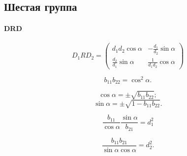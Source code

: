 \subsection{Шестая группа}

\paragraph{DRD}

$$D_1RD_2 =
\begin{pmatrix}
	d_1 d_2 \cos\alpha & -\frac{d_1}{d_2}\sin\alpha \\
	\frac{d_2}{d_1} \sin\alpha & \frac{1}{d_1 d_2}\cos\alpha
\end{pmatrix}$$

$$b_{11} b_{22} = \cos^2 \alpha.$$

$$\cos \alpha = \pm \sqrt{b_{11} b_{22}};$$
$$\sin \alpha = \pm \sqrt{1 - b_{11} b_{22}}.$$

$$\frac{b_{11}}{\cos\alpha} \frac{\sin\alpha}{b_{21}} = d_1^2$$

$$\frac{b_{11} b_{21}}{\sin\alpha \cos\alpha} = d_2^2.$$

